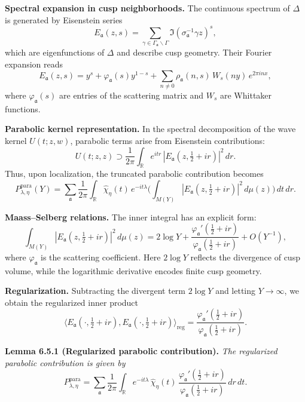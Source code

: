\medskip

\noindent\textbf{Spectral expansion in cusp neighborhoods.}
The continuous spectrum of $\Delta$ is generated by Eisenstein series
\[
  E_\mathfrak{a}(z,s)
  = \sum_{\gamma\in \Gamma_\mathfrak{a}\backslash \Gamma}
  \Im(\sigma_\mathfrak{a}^{-1}\gamma z)^s,
\]
which are eigenfunctions of $\Delta$ and describe cusp geometry.  
Their Fourier expansion reads
\[
  E_\mathfrak{a}(z,s)
  = y^s + \varphi_\mathfrak{a}(s) y^{1-s}
  + \sum_{n\neq 0} \rho_\mathfrak{a}(n,s)\, W_s(ny)\, e^{2\pi i n x},
\]
where $\varphi_\mathfrak{a}(s)$ are entries of the scattering matrix and $W_s$ are Whittaker functions.

\medskip

\noindent\textbf{Parabolic kernel representation.}
In the spectral decomposition of the wave kernel $U(t;z,w)$,  
parabolic terms arise from Eisenstein contributions:
\[
  U(t;z,z) \supset \frac{1}{2\pi}\int_\mathbb{R}
  e^{itr}\, |E_\mathfrak{a}(z,\tfrac12+ir)|^2\, dr.
\]
Thus, upon localization, the truncated parabolic contribution becomes
\[
  P_{\lambda,\eta}^{\mathrm{para}}(Y)
  = \sum_\mathfrak{a} \frac{1}{2\pi} \int_\mathbb{R}
  \widehat{\chi}_\eta(t)\, e^{-it\lambda}
  \Big( \int_{M(Y)} |E_\mathfrak{a}(z,\tfrac12+ir)|^2\, d\mu(z)\Big)\, dt\, dr.
\]

\medskip

\noindent\textbf{Maass–Selberg relations.}
The inner integral has an explicit form:
\[
  \int_{M(Y)} |E_\mathfrak{a}(z,\tfrac12+ir)|^2\, d\mu(z)
  = 2\log Y
  + \frac{\varphi_\mathfrak{a}'(\tfrac12+ir)}{\varphi_\mathfrak{a}(\tfrac12+ir)}
  + O(Y^{-1}),
\]
where $\varphi_\mathfrak{a}$ is the scattering coefficient.  
Here $2\log Y$ reflects the divergence of cusp volume,  
while the logarithmic derivative encodes finite cusp geometry.

\medskip

\noindent\textbf{Regularization.}
Subtracting the divergent term $2\log Y$ and letting $Y\to\infty$,  
we obtain the regularized inner product
\[
  \langle E_\mathfrak{a}(\cdot,\tfrac12+ir),
  E_\mathfrak{a}(\cdot,\tfrac12+ir)\rangle_{\mathrm{reg}}
  = \frac{\varphi_\mathfrak{a}'(\tfrac12+ir)}{\varphi_\mathfrak{a}(\tfrac12+ir)}.
\]

\medskip

\noindent\textbf{Lemma 6.5.1 (Regularized parabolic contribution).}
\emph{The regularized parabolic contribution is given by}
\[
  P_{\lambda,\eta}^{\mathrm{para}}
  = \sum_\mathfrak{a} \frac{1}{2\pi}\int_\mathbb{R}
  e^{-it\lambda}\, \widehat{\chi}_\eta(t)\,
  \frac{\varphi_\mathfrak{a}'(\tfrac12+ir)}{\varphi_\mathfrak{a}(\tfrac12+ir)}\, dr\, dt.
\]


